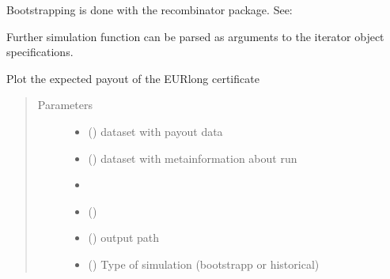 \documentclass[a4paper,11pt,english]{sphinxmanual}
\begin{document}
\sphinxAtStartPar
Bootstrapping is done with the recombinator package.
See: 

\sphinxAtStartPar
Further simulation function can be parsed as arguments to the iterator object
specifications.

\begin{fulllineitems}
\label{\detokenize{simulation_analysis:src.simulation_analysis.task_swap_payout_analysis.plot_eurlong_payout}}
\sphinxAtStartPar
Plot the expected payout of the EURlong certificate
\begin{quote}\begin{description}
\item[{Parameters}] \leavevmode\begin{itemize}
\item {} 
\sphinxAtStartPar
{} () \textendash{} dataset with payout data

\item {} 
\sphinxAtStartPar
{} () \textendash{} dataset with metainformation about run

\item {} 
\sphinxAtStartPar
\sphinxstyleliteralstrong{\sphinxupquote{(}} \textendash{} 

\item {} 
\sphinxAtStartPar
{}\sphinxstyleliteralstrong{\sphinxupquote{)}} () \textendash{} 

\item {} 
\sphinxAtStartPar
{} () \textendash{} output path

\item {} 
\sphinxAtStartPar
{} () \textendash{} Type of simulation (bootstrapp or historical)

\end{itemize}

\end{description}\end{quote}

\end{fulllineitems}
\end{document}
